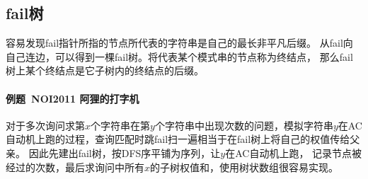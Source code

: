 \subsection{fail树}
容易发现fail指针所指的节点所代表的字符串是自己的最长非平凡后缀。
从fail向自己连边，可以得到一棵fail树。将代表某个模式串的节点称为终结点，
那么fail树上某个终结点是它子树内的终结点的后缀。

\paragraph{例题~NOI2011 阿狸的打字机}
对于多次询问求第$x$个字符串在第$y$个字符串中出现次数的问题，模拟字符串$y$在AC
自动机上跑的过程，查询匹配时跳fail扫一遍相当于在fail树上将自己的权值传给父亲。
因此先建出fail树，按DFS序平铺为序列，让$y$在AC自动机上跑，
记录节点被经过的次数，最后求询问中所有$x$的子树权值和，使用树状数组很容易实现。
